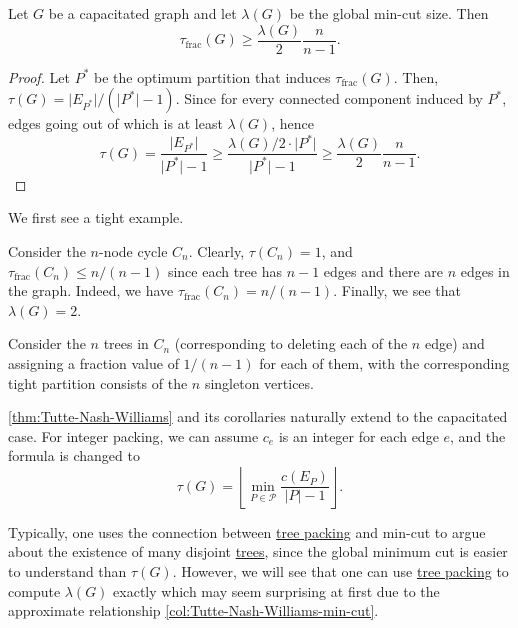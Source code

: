 \begin{corollary}\label{col:Tutte-Nash-Williams-min-cut}
	Let \(G\) be a capacitated graph and let \(\lambda (G)\) be the global min-cut size. Then
	\[
		\tau _{\text{frac} }(G)
		\geq \frac{\lambda (G)}{2} \frac{n}{n - 1}.
	\]
\end{corollary}
\begin{proof}
	Let \(P^{\ast} \) be the optimum partition that induces \(\tau _{\text{frac} }(G)\). Then, \(\tau (G) = \lvert E_{P^{\ast} } \rvert / (\lvert P^{\ast} \rvert - 1)\). Since for every connected component induced by \(P^{\ast} \), edges going out of which is at least \(\lambda (G)\), hence
	\[
		\tau (G)
		= \frac{\lvert E_{P^{\ast} } \rvert }{\lvert P^{\ast}  \rvert - 1}
		\geq \frac{\lambda (G) / 2 \cdot \lvert P^{\ast} \rvert }{\lvert P^{\ast} \rvert - 1}
		\geq \frac{\lambda (G)}{2} \frac{n}{n-1}.
	\]
\end{proof}

We first see a tight example.

\begin{eg}[Cycle]
	Consider the \(n\)-node cycle \(C_n\). Clearly, \(\tau (C_n) = 1\), and \(\tau _{\text{frac} }(C_n) \leq n / (n-1)\) since each tree has \(n-1\) edges and there are \(n\) edges in the graph. Indeed, we have \(\tau _{\text{frac} } (C_n) = n / (n-1)\). Finally, we see that \(\lambda (G) = 2\).
\end{eg}
\begin{explanation}
	Consider the \(n\) trees in \(C_n\) (corresponding to deleting each of the \(n\) edge) and assigning a fraction value of \(1 / (n-1)\) for each of them, with the corresponding tight partition consists of the \(n\) singleton vertices.
\end{explanation}

\begin{note}
	\autoref{thm:Tutte-Nash-Williams} and its corollaries naturally extend to the capacitated case. For integer packing, we can assume \(c_e\) is an integer for each edge \(e\), and the formula is changed to
	\[
		\tau (G)
		= \left\lfloor \min _{P \in \mathcal{P} } \frac{c(E_P)}{\lvert P \rvert - 1} \right\rfloor .
	\]
\end{note}

Typically, one uses the connection between \hyperref[prb:TP]{tree packing} and min-cut to argue about the existence of many disjoint \hyperref[def:spanning-tree]{trees}, since the global minimum cut is easier to understand than \(\tau (G)\). However, we will see that one can use \hyperref[prb:TP]{tree packing} to compute \(\lambda (G)\) exactly which may seem surprising at first due to the approximate relationship \autoref{col:Tutte-Nash-Williams-min-cut}.

